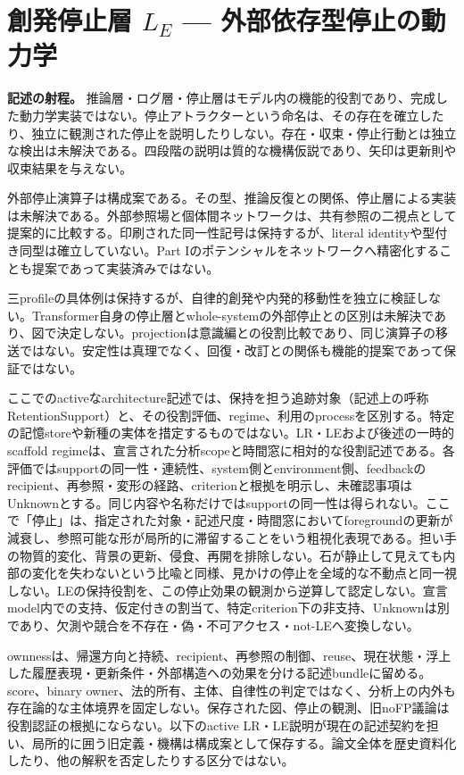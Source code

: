\section{創発停止層 $L_E$ — 外部依存型停止の動力学}

\noindent\textbf{記述の射程。} 推論層・ログ層・停止層はモデル内の機能的役割であり、完成した動力学実装ではない。停止アトラクターという命名は、その存在を確立したり、独立に観測された停止を説明したりしない。存在・収束・停止行動とは独立な検出は未解決である。四段階の説明は質的な機構仮説であり、矢印は更新則や収束結果を与えない。

外部停止演算子は構成案である。その型、推論反復との関係、停止層による実装は未解決である。外部参照場と個体間ネットワークは、共有参照の二視点として提案的に比較する。印刷された同一性記号は保持するが、literal identityや型付き同型は確立していない。Part Iのポテンシャルをネットワークへ精密化することも提案であって実装済みではない。

三profileの具体例は保持するが、自律的創発や内発的移動性を独立に検証しない。Transformer自身の停止層とwhole-systemの外部停止との区別は未解決であり、図で決定しない。projectionは意識編との役割比較であり、同じ演算子の移送ではない。安定性は真理でなく、回復・改訂との関係も機能的提案であって保証ではない。

ここでのactiveなarchitecture記述では、保持を担う追跡対象（記述上の呼称RetentionSupport）と、その役割評価、regime、利用のprocessを区別する。特定の記憶storeや新種の実体を措定するものではない。LR・LEおよび後述の一時的scaffold regimeは、宣言された分析scopeと時間窓に相対的な役割記述である。各評価ではsupportの同一性・連続性、system側とenvironment側、feedbackのrecipient、再参照・変形の経路、criterionと根拠を明示し、未確認事項はUnknownとする。同じ内容や名称だけではsupportの同一性は得られない。ここで「停止」は、指定された対象・記述尺度・時間窓においてforegroundの更新が減衰し、参照可能な形が局所的に滞留することをいう粗視化表現である。担い手の物質的変化、背景の更新、侵食、再開を排除しない。石が静止して見えても内部の変化を失わないという比喩と同様、見かけの停止を全域的な不動点と同一視しない。LEの保持役割を、この停止効果の観測から逆算して認定しない。宣言model内での支持、仮定付きの割当て、特定criterion下の非支持、Unknownは別であり、欠測や競合を不存在・偽・不可アクセス・not-LEへ変換しない。

ownnessは、帰還方向と持続、recipient、再参照の制御、reuse、現在状態・浮上した履歴表現・更新条件・外部構造への効果を分ける記述bundleに留める。score、binary owner、法的所有、主体、自律性の判定ではなく、分析上の内外も存在論的な主体境界を固定しない。保存された図、停止の観測、旧noFP議論は役割認証の根拠にならない。以下のactive LR・LE説明が現在の記述契約を担い、局所的に囲う旧定義・機構は構成案として保存する。論文全体を歴史資料化したり、他の解釈を否定したりする区分ではない。



